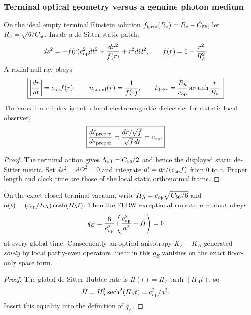 \documentclass[12pt,a4paper]{article}
\begin{document}
\subsubsection{Terminal optical geometry versus a genuine photon medium}
\label{p8:sec:v2168-terminal-optical-geometry}
\begin{proposition}
\label{p8:prop:v2168-terminal-static-optical-delay}
On the ideal empty terminal Einstein solution
$f_{\rm term}(R_{\rm g})=R_{\rm g}-C_{56}$, let
$R_h=\sqrt{6/C_{56}}$.  Inside a de-Sitter static patch,
\[
 ds^2=-f(r)c_{\rm op}^2dt^2+\frac{dr^2}{f(r)}+r^2d\Omega^2,
 \qquad f(r)=1-\frac{r^2}{R_h^2}.
\]
A radial null ray obeys
\[
 \boxed{\left|\frac{dr}{dt}\right|=c_{\rm op}f(r),
 \qquad n_{\rm coord}(r)=\frac1{f(r)},\qquad
 t_{0\to r}=\frac{R_h}{c_{\rm op}}
 \operatorname{artanh}\frac r{R_h}.}
\]
The coordinate index is not a local electromagnetic dielectric:
for a static local observer,
\[
 \boxed{\frac{d\ell_{\rm proper}}{d\tau_{\rm proper}}
 =\frac{dr/\sqrt f}{\sqrt f\,dt}=c_{\rm op}.}
\]
\end{proposition}
\begin{proof}
The terminal action gives $\Lambda_{\rm eff}=C_{56}/2$ and hence
the displayed static de-Sitter metric.  Set $ds^2=d\Omega^2=0$ and
integrate $dt=dr/(c_{\rm op}f)$ from $0$ to $r$.  Proper length and
clock time are those of the local static orthonormal frame.
\end{proof}
\begin{proposition}
\label{p8:prop:v2168-de-sitter-qe-zero}
On the exact closed terminal vacuum, write
$H_\Lambda=c_{\rm op}\sqrt{C_{56}/6}$ and
$a(t)=(c_{\rm op}/H_\Lambda)\cosh(H_\Lambda t)$.
Then the FLRW exceptional curvature readout obeys
\[
 q_E=\frac6{c_{\rm op}^2}
 \left(\frac{c_{\rm op}^2}{a^2}-\dot H\right)
 =0
\]
at every global time.  Consequently an optical anisotropy
$K_E-K_B$ generated \emph{solely} by local parity-even operators
linear in this $q_E$ vanishes on the exact floor-only space form.
\end{proposition}
\begin{proof}
The global de-Sitter Hubble rate is
$H(t)=H_\Lambda\tanh(H_\Lambda t)$, so
\[
 \dot H=H_\Lambda^2\operatorname{sech}^2(H_\Lambda t)
 =c_{\rm op}^2/a^2.
\]
Insert this equality into the definition of $q_E$.
\end{proof}
\end{document}
